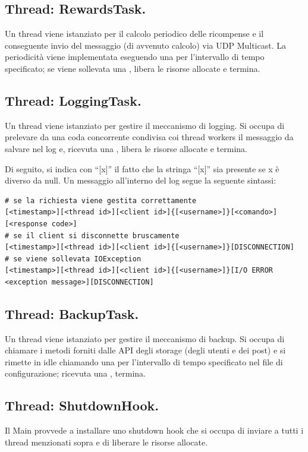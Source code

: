 \documentclass[11pt, italian, openany]{book}
\begin{document}
\begin{sloppypar}
\subsection*{Thread: RewardsTask.}
Un thread  viene istanziato per il calcolo periodico delle ricompense e il conseguente invio del messaggio (di avvenuto
calcolo) via UDP Multicast. La periodicit\`a viene implementata eseguendo una  per l'intervallo di tempo specificato; se viene
sollevata una , libera le risorse allocate e termina.

\subsection*{Thread: LoggingTask.}
Un thread  viene istanziato per gestire il meccanismo di logging. Si occupa di prelevare da una coda concorrente condivisa
coi thread workers il messaggio da salvare nel log e, ricevuta una , libera le risorse allocate e termina.

Di seguito, si indica con ``{[x]}'' il fatto che la stringa ``[x]'' sia presente se x \`e diverso da null.
Un messaggio all'interno del log segue la seguente sintassi:
\begin{lstlisting}[style=code]
# se la richiesta viene gestita correttamente
[<timestamp>][<thread id>][<client id>]{[<username>]}[<comando>][<response code>]
# se il client si disconnette bruscamente
[<timestamp>][<thread id>][<client id>]{[<username>]}[DISCONNECTION]
# se viene sollevata IOException
[<timestamp>][<thread id>][<client id>]{[<username>]}[I/O ERROR <exception message>][DISCONNECTION]
\end{lstlisting}

\subsection*{Thread: BackupTask.}
Un thread  viene istanziato per gestire il meccanismo di backup. Si occupa di chiamare i metodi forniti dalle API degli
storage (degli utenti e dei post) e si rimette in idle chiamando una  per l'intervallo di tempo specificato nel file di
configurazione; ricevuta una , termina.

\subsection*{Thread: ShutdownHook.}
Il Main provvede a installare uno shutdown hook che si occupa di inviare  a tutti i thread menzionati sopra e di
liberare le risorse allocate.


\end{sloppypar}
\end{document}
